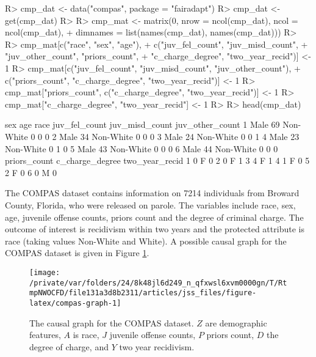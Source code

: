 \documentclass[
  nojss]{jss}
\begin{document}
\begin{CodeChunk}
\begin{CodeInput}
R> cmp_dat <- data("compas", package = "fairadapt")
R> cmp_dat <- get(cmp_dat)
R> 
R> cmp_mat <- matrix(0, nrow = ncol(cmp_dat), ncol = ncol(cmp_dat),
+                   dimnames = list(names(cmp_dat), names(cmp_dat)))
R> 
R> cmp_mat[c("race", "sex", "age"),
+         c("juv_fel_count", "juv_misd_count",
+           "juv_other_count", "priors_count",
+           "c_charge_degree", "two_year_recid")] <- 1
R> cmp_mat[c("juv_fel_count", "juv_misd_count", "juv_other_count"),
+         c("priors_count", "c_charge_degree", "two_year_recid")] <- 1
R> cmp_mat["priors_count", c("c_charge_degree", "two_year_recid")] <- 1
R> cmp_mat["c_charge_degree", "two_year_recid"] <- 1
R> 
R> head(cmp_dat)
\end{CodeInput}
\begin{CodeOutput}
   sex age      race juv_fel_count juv_misd_count juv_other_count
1 Male  69 Non-White             0              0               0
2 Male  34 Non-White             0              0               0
3 Male  24 Non-White             0              0               1
4 Male  23 Non-White             0              1               0
5 Male  43 Non-White             0              0               0
6 Male  44 Non-White             0              0               0
  priors_count c_charge_degree two_year_recid
1            0               F              0
2            0               F              1
3            4               F              1
4            1               F              0
5            2               F              0
6            0               M              0
\end{CodeOutput}
\end{CodeChunk}

The COMPAS dataset contains information on 7214 individuals from Broward
County, Florida, who were released on parole. The variables include
race, sex, age, juvenile offense counts, priors count and the degree of
criminal charge. The outcome of interest is recidivism within two years
and the protected attribute is race (taking values Non-White and White).
A possible causal graph for the COMPAS dataset is given in Figure
\ref{fig:compas-graph}.

\begin{CodeChunk}
\begin{figure}

{\centering \texttt{[image: /private/var/folders/24/8k48jl6d249\_n\_qfxwsl6xvm0000gn/T/RtmpNWOCFD/file131a3d8b2311/articles/jss\_files/figure-latex/compas-graph-1]} 

}

\caption[The causal graph for the COMPAS dataset]{The causal graph for the COMPAS dataset. $Z$ are demographic features, $A$ is race, $J$ juvenile offense counts, $P$ priors count, $D$ the degree of charge, and $Y$ two year recidivism.}\label{fig:compas-graph}
\end{figure}
\end{CodeChunk}
\end{document}
